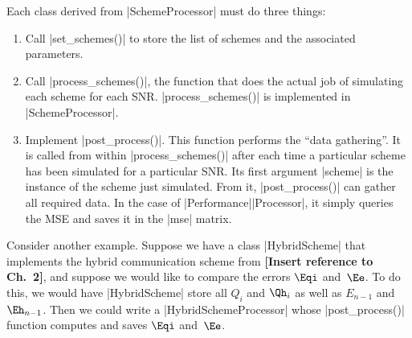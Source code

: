 Each class derived from |SchemeProcessor| must do three things:
\begin{enumerate}
  \item Call |set_schemes()| to store the list of schemes and the associated
    parameters.

  \item Call |process_schemes()|, the function that does the actual job of
    simulating each scheme for each SNR. |process_schemes()| is implemented in
    |SchemeProcessor|. 

  \item Implement |post_process()|. This function performs the ``data
    gathering''. It is called from within |process_schemes()| after each time a
    particular scheme has been simulated for a particular SNR. Its first
    argument |scheme| is the instance of the scheme just simulated. From it,
    |post_process()| can gather all required data.  In the case of
    |Performance|\-|Processor|, it simply queries the MSE and saves it in the
    |mse| matrix.
\end{enumerate}


Consider another example. Suppose we have a class |HybridScheme| that implements
the hybrid communication scheme from \textbf{[Insert reference to Ch.~2]}, and
suppose we would like to compare the errors $\Eqi$ and~$\Ee$. To do this, we would have |HybridScheme| store all $Q_i$ and
$\Qh_i$ as well as $E_{n-1}$ and $\Eh_{n-1}$. Then we could write a
|HybridSchemeProcessor| whose |post_process()| function computes and saves
$\Eqi$ and~$\Ee$. 


%
%
%
%
%
%
